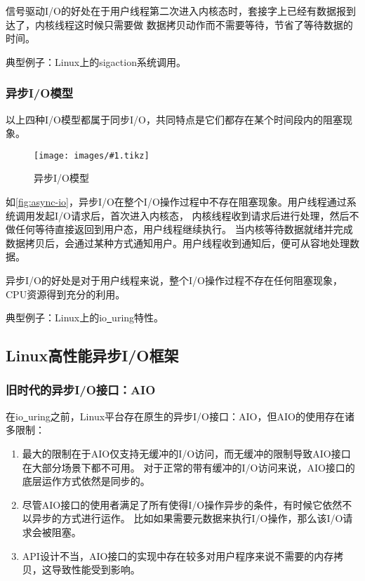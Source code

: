 \documentclass[supercite]{HustGraduPaper}
\newcommand{\cfig}[3]{
  \begin{figure}[htb]
    \centering
    \texttt{[image: images/\#1.tikz]}
    \caption{#3}
    \label{fig:#1}
  \end{figure}
}
\newcommand{\rfig}[1]{\autoref{fig:#1}}
\theoremstyle{definition}
\begin{document}
信号驱动I/O的好处在于用户线程第二次进入内核态时，套接字上已经有数据报到达了，内核线程这时候只需要做
数据拷贝动作而不需要等待，节省了等待数据的时间。\par

典型例子：Linux上的sigaction系统调用。\par

\subsubsection{异步I/O模型}
以上四种I/O模型都属于同步I/O，共同特点是它们都存在某个时间段内的阻塞现象。\par

\cfig{async-io}{0.7}{异步I/O模型}

如\rfig{async-io}，异步I/O在整个I/O操作过程中不存在阻塞现象。用户线程通过系统调用发起I/O请求后，首次进入内核态，
内核线程收到请求后进行处理，然后不做任何等待直接返回到用户态，用户线程继续执行。
当内核等待数据就绪并完成数据拷贝后，会通过某种方式通知用户。用户线程收到通知后，便可从容地处理数据。\par

异步I/O的好处是对于用户线程来说，整个I/O操作过程不存在任何阻塞现象，CPU资源得到充分的利用。\par

典型例子：Linux上的io\underline{~}uring特性。\par

\subsection{Linux高性能异步I/O框架}

\subsubsection{旧时代的异步I/O接口：AIO}
在io\underline{~}uring之前，Linux平台存在原生的异步I/O接口：AIO，但AIO的使用存在诸多限制：

\begin{enumerate}[label={(\arabic*)}]
  \item 最大的限制在于AIO仅支持无缓冲的I/O访问，而无缓冲的限制导致AIO接口在大部分场景下都不可用。
    对于正常的带有缓冲的I/O访问来说，AIO接口的底层运作方式依然是同步的。
  \item 尽管AIO接口的使用者满足了所有使得I/O操作异步的条件，有时候它依然不以异步的方式进行运作。
    比如如果需要元数据来执行I/O操作，那么该I/O请求会被阻塞。
  \item API设计不当，AIO接口的实现中存在较多对用户程序来说不需要的内存拷贝，这导致性能受到影响。
\end{enumerate}
\end{document}
